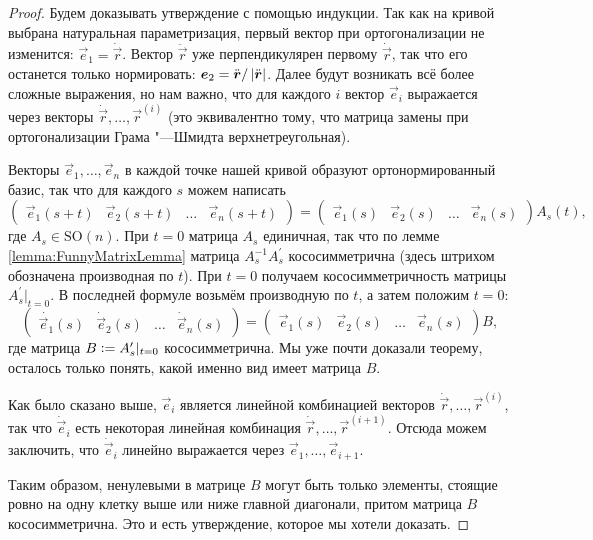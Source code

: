 \begin{proof}
	Будем доказывать утверждение с помощью индукции. Так как на кривой выбрана натуральная параметризация, первый вектор при ортогонализации не изменится: $\vec{e}_1 = \dot{\vec{r}}$. Вектор $\ddot{\vec{r}}$ уже перпендикулярен первому $\dot{\vec{r}}$, так что его останется только нормировать: $\boldsymbol{e}_2 = \ddot{\boldsymbol{r}} / \left\lvert\ddot{\boldsymbol{r}}\right\rvert$. Далее будут возникать всё более сложные выражения, но нам важно, что для каждого $i$ вектор $\vec{e}_i$ выражается через векторы $\dot{\vec{r}}, \ldots, \vec{r}^{(i)}$ (это эквивалентно тому, что матрица замены при ортогонализации Грама "---Шмидта верхнетреугольная).

	Векторы $\vec{e}_1, \ldots, \vec{e}_n$ в каждой точке нашей кривой образуют ортонормированный базис, так что для каждого $s$ можем написать
	\[
		\begin{pmatrix}
			\vec{e}_1(s + t) & \vec{e}_2(s + t) & \ldots & \vec{e}_n(s + t)
		\end{pmatrix} =
		\begin{pmatrix}
			\vec{e}_1(s) & \vec{e}_2(s) & \ldots & \vec{e}_n(s)
		\end{pmatrix}A_s(t),
	\]
	где $A_s \in \mathrm{SO}(n)$. При $t = 0$ матрица $A_s$ единичная, так что по лемме \ref{lemma:FunnyMatrixLemma} матрица $A_s^{-1}A_s^\prime$ кососимметрична (здесь штрихом обозначена производная по $t$). При $t = 0$ получаем кососимметричность матрицы $A_s^\prime|_{t = 0}$. В последней формуле возьмём производную по $t$, а затем положим $t = 0$:
	\[
		\begin{pmatrix}
			\dot{\vec{e}_1}(s) & \dot{\vec{e}}_2(s) & \ldots & \dot{\vec{e}}_n(s)
		\end{pmatrix} =
		\begin{pmatrix}
			\vec{e}_1(s) & \vec{e}_2(s) & \ldots & \vec{e}_n(s)
		\end{pmatrix}B,
	\]
	где матрица $B \vcentcolon = A_s^\prime|_{t = 0}$ кососимметрична. Мы уже почти доказали теорему, осталось только понять, какой именно вид имеет матрица $B$.

	Как было сказано выше, $\vec{e}_i$ является линейной комбинацией векторов $\dot{\vec{r}}, \ldots, \vec{r}^{(i)}$, так что $\dot{\vec{e}}_i$ есть некоторая линейная комбинация $\dot{\vec{r}}, \ldots, \vec{r}^{(i + 1)}$. Отсюда можем заключить, что $\dot{\vec{e}}_i$ линейно выражается через $\vec{e}_1, \ldots, \vec{e}_{i + 1}$.

	Таким образом, ненулевыми в матрице $B$ могут быть только элементы, стоящие ровно на одну клетку выше или ниже главной диагонали, притом матрица $B$ кососимметрична. Это и есть утверждение, которое мы хотели доказать.
\end{proof}

